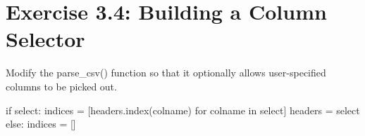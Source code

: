 \documentclass[
  letterpaper,
  DIV=11,
  numbers=noendperiod]{scrreprt}
\newenvironment{Shaded}{\begin{snugshade}}{\end{snugshade}}
\newcommand{\ControlFlowTok}[1]{\textcolor[rgb]{0.00,0.46,0.62}{#1}}
\newcommand{\KeywordTok}[1]{\textcolor[rgb]{0.00,0.46,0.62}{#1}}
\newcommand{\NormalTok}[1]{\textcolor[rgb]{0.00,0.46,0.62}{#1}}
\newcommand{\OperatorTok}[1]{\textcolor[rgb]{0.37,0.37,0.37}{#1}}
\begin{document}
\hypertarget{exercise-3.4-building-a-column-selector}{%
\section{Exercise 3.4: Building a Column
Selector}\label{exercise-3.4-building-a-column-selector}}

Modify the parse\_csv() function so that it optionally allows
user-specified columns to be picked out.

\begin{Shaded}
\begin{Highlighting}[]
        \ControlFlowTok{if}\NormalTok{ select:}
\NormalTok{            indices }\OperatorTok{=}\NormalTok{ [headers.index(colname) }\ControlFlowTok{for}\NormalTok{ colname }\KeywordTok{in}\NormalTok{ select]}
\NormalTok{            headers }\OperatorTok{=}\NormalTok{ select}
        \ControlFlowTok{else}\NormalTok{:}
\NormalTok{            indices }\OperatorTok{=}\NormalTok{ []}
\end{Highlighting}
\end{Shaded}
\end{document}
